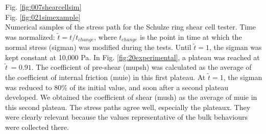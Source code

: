 Fig. \ref{fig:007shearcellsim} \\


Fig. \ref{fig:021simexample} \\


Numerical samples of the stress path
    for the Schulze ring shear cell tester.
	Time was normalized: $\tilde{t} = t/t_{change}$, where $t_{change}$ is the
	point in time at which the normal stress (\acs{sigman}) was modified during the
	tests.
	Until $\tilde{t}=1$, the \acs{sigman} was kept constant at 10,000 Pa.
	In Fig. \ref{fig:20experimental},
 	a plateau was reached at $\tilde{t}~=0.91$.
	The coefficient of pre-shear (\acs{mupsh}) was calculated as the average of the
	coefficient of internal friction (\acs{muie}) in this first plateau.
	At $\tilde{t}=1$, the \acs{sigman} was reduced to $80 \%$ of its initial
	value, and soon after
	a second plateau developed.
	We obtained the coefficient of
	shear (\acs{mush}) as the average of \acs{muie} in this second plateau.
	The stress paths agree well, especially the plateaux.
	They were clearly relevant because
	the values representative of the bulk behaviours
	were collected there.